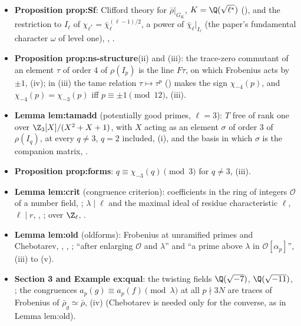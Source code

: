 \begin{itemize}
; the isomorphism $\bar\rho\simeq\bar\rho\otimes\chi_{-3}$ comes from induction from $\Q(\sqrt{-3})$, $\bar\rho\otimes\Fbar_3\simeq\Ind\psi$ with
$\Ind\psi\otimes\chi_{-3}\simeq\Ind\psi$ (), not from Frobenius traces;  gives the equivalent trace criterion
($3\mid a_p$ for almost all $p\equiv2\pmod3$), which the book uses in an example of  and the paper does not use. Only for the original version of
Lemma lem:h0: complex multiplication and $a_p=0$ at inert primes, ,  ().
\item \textbf{Proposition prop:Sf}: Clifford theory for $\bar\rho|_{G_K}$, $K=\Q(\sqrt{\ell^*})$ (), and the restriction to $I_\ell$ of
$\chi_{\ell^*}=\bar\chi_\ell^{(\ell-1)/2}$, a power of $\bar\chi_\ell|_{I_\ell}$ (the paper's fundamental character $\omega$ of level one), ,
.
\item \textbf{Proposition prop:ns-structure}(ii) and (iii): the trace-zero commutant of an element $\tau$ of order $4$ of $\rho(I_p)$ is the line $F\tau$, on which
Frobenius acts by $\pm1$, (iv); in (iii) the tame relation $\tau\mapsto\tau^p$ () makes the sign $\chi_{-4}(p)$, and
$\chi_{-4}(p)=\chi_{-3}(p)$ iff $p\equiv\pm1\pmod{12}$, (iii).
\item \textbf{Lemma lem:tamadd} (potentially good primes, $\ell=3$): $T$ free of rank one over $\Z_3[X]/(X^2+X+1)$, with $X$ acting as an element $\sigma$ of order
$3$ of $\rho(I_q)$, at every $q\ne3$, $q=2$ included, (i), and the basis in which $\sigma$ is the companion matrix, .
\item \textbf{Proposition prop:forms}: $q\equiv\chi_{-3}(q)\pmod3$ for $q\ne3$, (iii).
\item \textbf{Lemma lem:crit} (congruence criterion): coefficients in the ring of integers $\mathcal O$ of a number field, ; $\lambda\mid\ell$ and the
maximal ideal of residue characteristic $\ell$, $\ell\mid r$, , ; over $\Z_\ell$, .
\item \textbf{Lemma lem:old} (oldforms): Frobenius at unramified primes and Chebotarev, , , ; ``after
enlarging $\mathcal O$ and $\lambda$'' and ``a prime above $\lambda$ in $\mathcal O[\alpha_p]$'', (iii) to (v).
\item \textbf{Section 3 and Example ex:qual}: the twisting fields $\Q(\sqrt{-7})$, $\Q(\sqrt{-11})$, ; the congruences
$a_p(g)\equiv a_p(f)\pmod\lambda$ at all $p\nmid3N$ are traces of Frobenius of $\bar\rho_g\simeq\bar\rho$, (iv) (Chebotarev is needed only
for the converse, as in Lemma lem:old).
\end{itemize}


